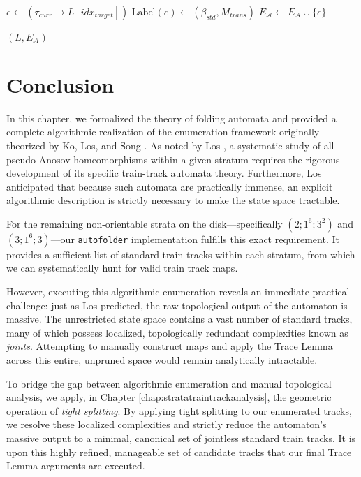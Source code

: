 \begin{algorithm}[p]
\begin{algorithmic}[1]
            \State {}
            \State $e \gets (\tau_{curr} \to L[idx_{target}])$
            \State $\text{Label}(e) \gets (\beta_{std}, M_{trans})$
            \State $E_{\mathcal{A}} \gets E_{\mathcal{A}} \cup \{e\}$
        \EndFor
    \EndFor
\EndWhile

\State \Return $(L, E_{\mathcal{A}})$
\end{algorithmic}
\end{algorithm}

\fi


\section{Conclusion}

In this chapter, we formalized the theory of folding automata and provided a complete algorithmic realization of the enumeration framework originally theorized by Ko, Los, and Song \cite{SongEntropy}. As noted by Los \cite{Los2008}, a systematic study of all pseudo-Anosov homeomorphisms within a given stratum requires the rigorous development of its specific train-track automata theory. Furthermore, Los anticipated that because such automata are practically immense, an explicit algorithmic description is strictly necessary to make the state space tractable.

For the remaining non-orientable strata on the disk---specifically $(2; 1^6; 3^2)$ and $(3; 1^6; 3)$---our \texttt{autofolder} implementation fulfills this exact requirement. It provides a sufficient list of standard train tracks within each stratum, from which we can systematically hunt for valid train track maps.

However, executing this algorithmic enumeration reveals an immediate practical challenge: just as Los predicted, the raw topological output of the automaton is massive. The unrestricted state space contains a vast number of standard tracks, many of which possess localized, topologically redundant complexities known as \textit{joints}. Attempting to manually construct maps and apply the Trace Lemma across this entire, unpruned space would remain analytically intractable.

To bridge the gap between algorithmic enumeration and manual topological analysis, we apply, in Chapter \ref{chap:stratatraintrackanalysis}, the geometric operation of \textit{tight splitting}. By applying tight splitting to our enumerated tracks, we resolve these localized complexities and strictly reduce the automaton's massive output to a minimal, canonical set of jointless standard train tracks. It is upon this highly refined, manageable set of candidate tracks that our final Trace Lemma arguments are executed.